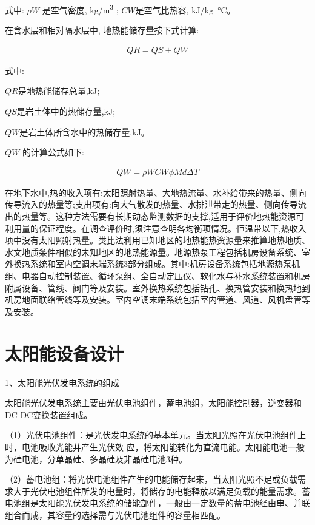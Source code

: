式中: $\rho W$ 是空气密度, \si{kg/m^3} ; $CW$是空气比热容, \si{kJ/kg\degreeCelsius}。

在含水层和相对隔水层中, 地热能储存量按下式计算:

\begin{align}
  QR=QS+QW
\end{align}

式中:

$QR$是地热能储存总量,kJ;

$QS$是岩土体中的热储存量,kJ;

$QW$是岩土体所含水中的热储存量,kJ。

$QW$ 的计算公式如下:

\begin{align}
  QW=\rho WCW\phi Md\Delta T
\end{align}

在地下水中,热的收入项有:太阳照射热量、大地热流量、水补给带来的热量、侧向传导流入的热量等;支出项有:向大气散发的热量、水排泄带走的热量、侧向传导流出的热量等。这种方法需要有长期动态监测数据的支撑,适用于评价地热能资源可利用量的保证程度。在调查评价时,须注意查明各均衡项情况。恒温带以下,热收入项中没有太阳照射热量。类比法利用已知地区的地热能热资源量来推算地热地质、水文地质条件相似的未知地区的地热能源量。地源热泵工程包括机房设备系统、室外换热系统和室内空调末端系统3部分组成。其中:机房设备系统包括地源热泵机组、电器自动控制装置、循环泵组、全自动定压仪、软化水与补水系统装置和机房附属设备、管线、阀门等及安装。室外换热系统包括钻孔、换热管安装和换热地到机房地面联络管线等及安装。室内空调末端系统包括室内管道、风道、风机盘管等及安装。

\section{ 太阳能设备设计 }
\label{sec:energy-solar-device}

1、太阳能光伏发电系统的组成

太阳能光伏发电系统主要由光伏电池组件，蓄电池组，太阳能控制器，逆变器和DC-DC变换装置组成。

（1）光伏电池组件：是光伏发电系统的基本单元。当太阳光照在光伏电池组件上时，电池吸收光能并产生光伏效
应，将太阳能转化为直流电能。太阳能电池一般为硅电池，分单晶硅、多晶硅及非晶硅电池3种。

（2）蓄电池组：将光伏电池组件产生的电能储存起来，当太阳光照不足或负载需求大于光伏电池组件所发的电量时，将储存的电能释放以满足负载的能量需求。蓄电池组是太阳能光伏发电系统的储能部件，一般由一定数量的蓄电池经由串、并联组合而成，其容量的选择需与光伏电池组件的容量相匹配。

